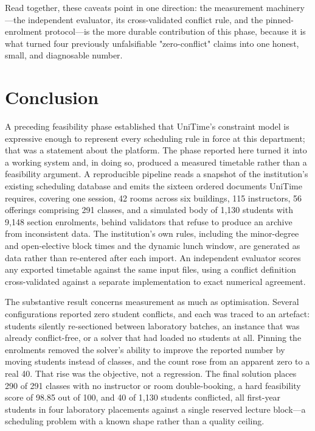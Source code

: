 \documentclass[journal]{IEEEtran}
\begin{document}
Read together, these caveats point in one direction: the measurement machinery---the independent evaluator, its cross-validated conflict rule, and the pinned-enrolment protocol---is the more durable contribution of this phase, because it is what turned four previously unfalsifiable "zero-conflict" claims into one honest, small, and diagnosable number.

\section{Conclusion}
\label{sec:conclusion}

A preceding feasibility phase established that UniTime's constraint model is expressive enough to represent every scheduling rule in force at this department; that was a statement about the platform. The phase reported here turned it into a working system and, in doing so, produced a measured timetable rather than a feasibility argument. A reproducible pipeline reads a snapshot of the institution's existing scheduling database and emits the sixteen ordered documents UniTime requires, covering one session, 42 rooms across six buildings, 115 instructors, 56 offerings comprising 291 classes, and a simulated body of 1{,}130 students with 9{,}148 section enrolments, behind validators that refuse to produce an archive from inconsistent data. The institution's own rules, including the minor-degree and open-elective block times and the dynamic lunch window, are generated as data rather than re-entered after each import. An independent evaluator scores any exported timetable against the same input files, using a conflict definition cross-validated against a separate implementation to exact numerical agreement.

The substantive result concerns measurement as much as optimisation. Several configurations reported zero student conflicts, and each was traced to an artefact: students silently re-sectioned between laboratory batches, an instance that was already conflict-free, or a solver that had loaded no students at all. Pinning the enrolments removed the solver's ability to improve the reported number by moving students instead of classes, and the count rose from an apparent zero to a real 40. That rise was the objective, not a regression. The final solution places 290 of 291 classes with no instructor or room double-booking, a hard feasibility score of 98.85 out of 100, and 40 of 1{,}130 students conflicted, all first-year students in four laboratory placements against a single reserved lecture block---a scheduling problem with a known shape rather than a quality ceiling.
\end{document}
